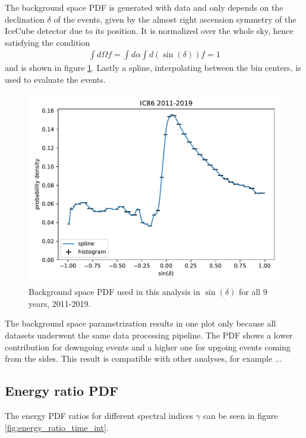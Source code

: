 The background space PDF is generated with data and only depends on the declination $\delta$ of the events, given by the almost right ascension symmetry of the IceCube detector due to its position.
It is normalized over the whole sky, hence satisfying the condition
\begin{align}
  \int d\Omega f = \int d\alpha \int d(\sin(\delta)) f = 1
\end{align}
and is shown in figure \ref{fig:bg_param_time_int}.
Lastly a spline, interpolating between the bin centers, is used to evaluate the events.
\begin{figure}
    \centering
    \includegraphics[width=\linewidth]{Plots/05_csky/bg_space_pdf.pdf}
    \caption{Background space PDF used in this analysis in $\sin{(\delta)}$ for all $\num{9}$ years, 2011-2019.}
    \label{fig:bg_param_time_int}
\end{figure}
The background space parametrization results in one plot only because all datasets underwent the same data processing pipeline.
The PDF shows a lower contribution for downgoing events and a higher one for upgoing events coming from the sides.
This result is compatible with other analyses, for example ...

\subsection{Energy ratio PDF}

The energy PDF ratios for different spectral indices $\gamma$ can be seen in figure \ref{fig:energy_ratio_time_int}.

